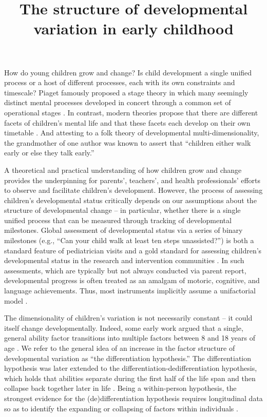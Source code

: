 \documentclass[man, floatsintext]{apa7}
\title{The structure of developmental variation in early childhood}
\begin{document}
\maketitle

How do young children grow and change? Is child development a single
uniﬁed process or a host of different processes, each with its own
constraints and timescale? Piaget famously proposed a stage theory in
which many seemingly distinct mental processes developed in concert
through a common set of operational stages \parencite{flavell1963}. In contrast, modern
theories propose that there are different facets of children's mental
life and that these facets each develop on their own timetable \parencite{gelman1983}. And attesting to a folk theory of developmental multi-dimensionality, the
grandmother of one author was known to assert that
``children either walk early or else they talk early.''

A theoretical and practical understanding of how children grow and change
provides the underpinning for parents', teachers', and health professionals'
efforts to observe and facilitate children's development. However, the process of assessing
children's developmental status critically depends on our assumptions
about the structure of developmental change -- in particular, whether
there is a single uniﬁed process that can be measured through tracking
of developmental milestones. Global assessment of developmental status
via a series of binary milestones (e.g., ``Can your child walk at least
ten steps unassisted?'') is both a standard feature of pediatrician
visits \parencite{sheldrick2019} and a gold standard for assessing children's developmental
status in the research and intervention communities \parencite{sheldrick2019,bayley2009,bricker1999,mccoy2019}. In such
assessments, which are typically but not always conducted via parent
report, developmental progress is often treated as an
amalgam of motoric, cognitive, and language achievements. Thus, most
instruments implicitly assume a unifactorial model \parencite[although some also
provide subscale scores;][]{bayley2009}.

The dimensionality of children's variation is not necessarily constant -- it could itself change developmentally.
Indeed, some early work argued that a single, general
ability factor transitions into multiple factors between 8 and 18 years of age
\parencite{garrett1946}. We refer to the general idea of an increase in the factor structure of developmental variation as ``the differentiation hypothesis.'' The differentiation hypothesis was later extended to the
differentiation-dedifferentiation hypothesis, which holds that abilities
separate during the first half of the life span and then collapse back
together later in life \parencite{lienert1964,breit2020}. Being a within-person hypothesis, the
strongest evidence for the (de)differentiation hypothesis requires
longitudinal data so as to identify the expanding or collapsing of
factors within individuals \parencite{hulur2015}.
\end{document}
